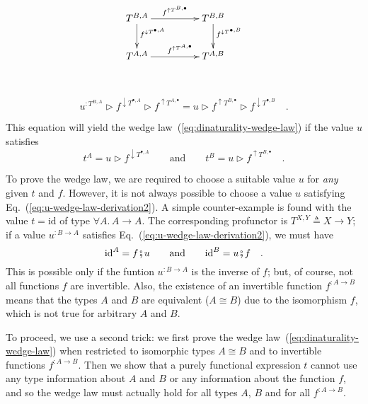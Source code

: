 \begin{wrapfigure}[6]{l}{0.3\columnwidth}%
\vspace{-0.6\baselineskip}
\[
\xymatrix{\xyScaleY{2.0pc}\xyScaleX{4.0pc}T^{B,A}\ar[d]\sp(0.37){f^{\downarrow T^{\bullet,A}}}\ar[r]\sp(0.5){f^{\uparrow T^{B,\bullet}}} & T^{B,B}\ar[d]\sp(0.37){f^{\downarrow T^{\bullet,B}}}\\
T^{A,A}\ar[r]\sp(0.5){~~~f^{\uparrow T^{A,\bullet}}} & T^{A,B}
}
\]

\vspace{-0\baselineskip}
\end{wrapfigure}%

~\vspace{-0.8\baselineskip}

\begin{equation}
u^{:T^{B,A}}\triangleright f^{\downarrow T^{\bullet,A}}\triangleright f^{\uparrow T^{A,\bullet}}=u\triangleright f^{\uparrow T^{B,\bullet}}\triangleright f^{\downarrow T^{\bullet,B}}\quad.\label{eq:u-wedge-law-derivation1}
\end{equation}

\noindent This equation will yield the wedge law~(\ref{eq:dinaturality-wedge-law})
if the value $u$ satisfies
\begin{equation}
t^{A}=u\triangleright f^{\downarrow T^{\bullet,A}}\quad\quad\text{and}\quad\quad t^{B}=u\triangleright f^{\uparrow T^{B,\bullet}}\quad.\label{eq:u-wedge-law-derivation2}
\end{equation}

\noindent To prove the wedge law, we are required to choose a suitable
value $u$ for \emph{any} given $t$ and $f$. However, it is not
always possible to choose a value $u$ satisfying Eq.~(\ref{eq:u-wedge-law-derivation2}).
A simple counter-example is found with the value $t=\text{id}$ of
type $\forall A.\,A\rightarrow A$. The corresponding profunctor is
$T^{X,Y}\triangleq X\rightarrow Y$; if a value $u^{:B\rightarrow A}$
satisfies Eq.~(\ref{eq:u-wedge-law-derivation2}), we must have
\[
\text{id}^{A}=f\bef u\quad\quad\text{and}\quad\quad\text{id}^{B}=u\bef f\quad.
\]
This is possible only if the funtion $u^{:B\rightarrow A}$ is the
inverse of $f$; but, of course, not all functions $f$ are invertible.
Also, the existence of an invertible function $f^{:A\rightarrow B}$
means that the types $A$ and $B$ are equivalent ($A\cong B$) due
to the isomorphism $f$, which is not true for arbitrary $A$ and
$B$.

To proceed, we use a second trick: we first prove the wedge law~(\ref{eq:dinaturality-wedge-law})
when restricted to isomorphic types $A\cong B$ and to invertible
functions $f^{:A\rightarrow B}$. Then we show that a purely functional
expression $t$ cannot use any type information about $A$ and $B$
or any information about the function $f$, and so the wedge law must
actually hold for all types $A$, $B$ and for all $f^{:A\rightarrow B}$.

